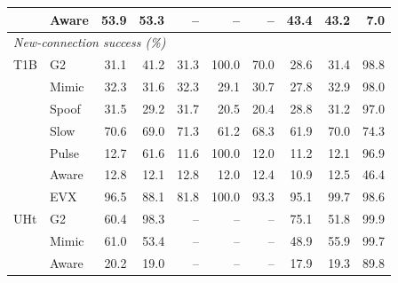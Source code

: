 \begin{table}[t]
\begin{tabular}{llrrrrrrrr}
 & Aware & 53.9 & 53.3 & -- & -- & -- & 43.4 & 43.2 & 7.0 \\
\midrule
\multicolumn{10}{l}{\textit{New-connection success (\%)}} \\
\midrule
T1B & G2 & 31.1 & 41.2 & 31.3 & 100.0 & 70.0 & 28.6 & 31.4 & 98.8 \\
 & Mimic & 32.3 & 31.6 & 32.3 & 29.1 & 30.7 & 27.8 & 32.9 & 98.0 \\
 & Spoof & 31.5 & 29.2 & 31.7 & 20.5 & 20.4 & 28.8 & 31.2 & 97.0 \\
 & Slow & 70.6 & 69.0 & 71.3 & 61.2 & 68.3 & 61.9 & 70.0 & 74.3 \\
 & Pulse & 12.7 & 61.6 & 11.6 & 100.0 & 12.0 & 11.2 & 12.1 & 96.9 \\
 & Aware & 12.8 & 12.1 & 12.8 & 12.0 & 12.4 & 10.9 & 12.5 & 46.4 \\
 & EVX & 96.5 & 88.1 & 81.8 & 100.0 & 93.3 & 95.1 & 99.7 & 98.6 \\
UHt & G2 & 60.4 & 98.3 & -- & -- & -- & 75.1 & 51.8 & 99.9 \\
 & Mimic & 61.0 & 53.4 & -- & -- & -- & 48.9 & 55.9 & 99.7 \\
 & Aware & 20.2 & 19.0 & -- & -- & -- & 17.9 & 19.3 & 89.8 \\
\bottomrule
\end{tabular}
\end{table}
